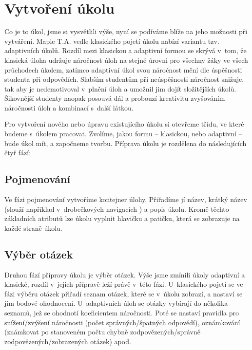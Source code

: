 \documentclass[
print,
  11pt,
  table,   
  nolof,    
  nolot,
  oneside,
  draft
]{fithesis3}
\begin{document}
	\section{Vytvoření úkolu} \label{sec:vytvoreniukol}

Co je to úkol, jsme si vysvětlili výše, nyní se podíváme blíže na jeho možnosti při vytváření. Maple T.A. vedle klasického pojetí úkolu nabízí variantu tzv. adaptivních úkolů. Rozdíl mezi klasickou a adaptivní formou se skrývá v~tom, že klasická úloha udržuje náročnost úloh na stejné úrovni pro všechny žáky ve všech průchodech úkolem, zatímco adaptivní úkol svou náročnost mění dle úspěšnosti studenta při odpovědích. Slabším studentům při neúspěšnosti náročnost snižuje, tak aby je nedemotivoval v~plnění úloh a umožnil jim dojít složitějších úkolů. Šikovnější studenty naopak posouvá dál a probouzí kreativitu zvyšováním náročnosti úloh a kombinací s~další látkou. 

Pro vytvoření nového nebo úpravu existujícího úkolu si otevřeme třídu, ve které budeme s~úkolem pracovat. Zvolíme, jakou formu – klasickou, nebo adaptivní – bude úkol mít, a započneme tvorbu. Příprava úkolu je rozdělena do následujících čtyř fází:

\subsection*{Pojmenování}
Ve fázi pojmenování vytvoříme kontejner úlohy. Přiřadíme jí název, krátký název (slouží například v~drobečkových navigacích ) a popis úkolu. Kromě těchto základních atributů lze úkolu vyplnit hlavičku a patičku, která se zobrazuje na každé straně úkolu.

\subsection*{Výběr otázek}
Druhou fází přípravy úkolu je výběr otázek. Výše jsme zmínili úkoly adaptivní a klasické, rozdíl v~jejich přípravě leží právě v~této fázi. U~klasického pojetí se ve fázi výběru otázek přiřadí seznam otázek, které se v~úkolu zobrazí, a nastaví se jim bodové ohodnocení. U~adaptivních úloh se otázky vybírají do několika seznamů, jež se ohodnotí koeficientem náročnosti. Poté se nastaví pravidla pro snížení/zvýšení náročnosti (počet správných/špatných odpovědí), oznámkování (známkovat po stanoveném počtu chybně zodpovězených/správně zodpovězených/zobrazených otázek) apod.
\end{document}
